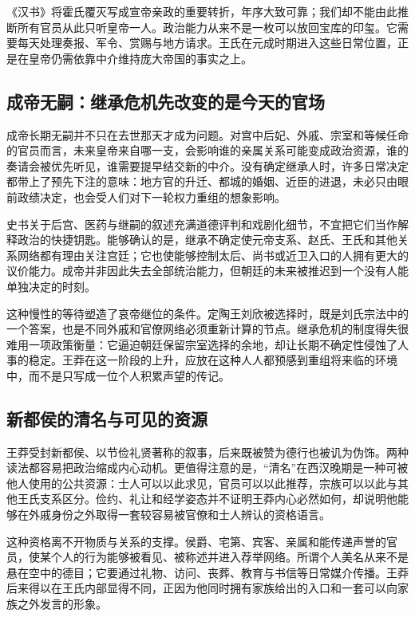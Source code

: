 《汉书》将霍氏覆灭写成宣帝亲政的重要转折，年序大致可靠；我们却不能由此推断所有官员从此只听皇帝一人。政治能力从来不是一枚可以放回宝库的印玺。它需要每天处理奏报、军令、赏赐与地方请求。王氏在元成时期进入这些日常位置，正是在皇帝仍需依靠中介维持庞大帝国的事实之上。

\subsection{成帝无嗣：继承危机先改变的是今天的官场}

成帝长期无嗣并不只在去世那天才成为问题。对宫中后妃、外戚、宗室和等候任命的官员而言，未来皇帝来自哪一支，会影响谁的亲属关系可能变成政治资源，谁的奏请会被优先听见，谁需要提早结交新的中介。没有确定继承人时，许多日常决定都带上了预先下注的意味：地方官的升迁、都城的婚姻、近臣的进退，未必只由眼前政绩决定，也会受人们对下一轮权力重组的想象影响。

史书关于后宫、医药与继嗣的叙述充满道德评判和戏剧化细节，不宜把它们当作解释政治的快捷钥匙。能够确认的是，继承不确定使元帝支系、赵氏、王氏和其他关系网络都有理由关注宫廷；它也使能够控制太后、尚书或近卫入口的人拥有更大的议价能力。成帝并非因此失去全部统治能力，但朝廷的未来被推迟到一个没有人能单独决定的时刻。

这种慢性的等待塑造了哀帝继位的条件。定陶王刘欣被选择时，既是刘氏宗法中的一个答案，也是不同外戚和官僚网络必须重新计算的节点。继承危机的制度得失很难用一项政策衡量：它逼迫朝廷保留宗室选择的余地，却让长期不确定性侵蚀了人事的稳定。王莽在这一阶段的上升，应放在这种人人都预感到重组将来临的环境中，而不是只写成一位个人积累声望的传记。

\subsection{新都侯的清名与可见的资源}

王莽受封新都侯、以节俭礼贤著称的叙事，后来既被赞为德行也被讥为伪饰。两种读法都容易把政治缩成内心动机。更值得注意的是，“清名”在西汉晚期是一种可被他人使用的公共资源：士人可以以此求见，官员可以以此推荐，宗族可以以此与其他王氏支系区分。俭约、礼让和经学姿态并不证明王莽内心必然如何，却说明他能够在外戚身份之外取得一套较容易被官僚和士人辨认的资格语言。

这种资格离不开物质与关系的支撑。侯爵、宅第、宾客、亲属和能传递声誉的官员，使某个人的行为能够被看见、被称述并进入荐举网络。所谓个人美名从来不是悬在空中的德目；它要通过礼物、访问、丧葬、教育与书信等日常媒介传播。王莽后来得以在王氏内部显得不同，正因为他同时拥有家族给出的入口和一套可以向家族之外发言的形象。

